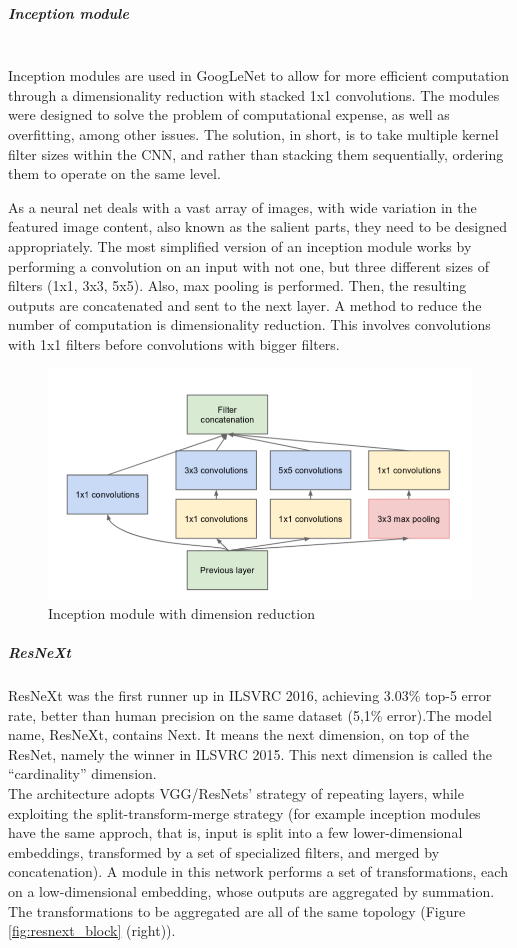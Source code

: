 \documentclass{article}
\begin{document}
\subparagraph{Inception module}\mbox{}\\
Inception modules are used in GoogLeNet to allow for more efficient computation through a dimensionality reduction with stacked 1x1 convolutions. The modules were designed to solve the problem of computational expense, as well as overfitting, among other issues. The solution, in short, is to take multiple kernel filter sizes within the CNN, and rather than stacking them sequentially, ordering them to operate on the same level. 

As a neural net deals with a vast array of images, with wide variation in the featured image content, also known as the salient parts, they need to be designed appropriately. The most simplified version of an inception module works by performing a convolution on an input with not one, but three different sizes of filters (1x1, 3x3, 5x5). Also, max pooling is performed. Then, the resulting outputs are concatenated and sent to the next layer.
A method to reduce the number of computation is dimensionality reduction. This involves convolutions with 1x1 filters before convolutions with bigger filters.
\begin{figure}[h]
	\centering
	\includegraphics[width=0.7\linewidth]{image/inc_module}
	\caption{Inception module with dimension reduction}
	\label{fig:incmodule}
\end{figure}




\subparagraph{ResNeXt}
ResNeXt \cite{resnext} was the first runner up in ILSVRC 2016, achieving 3.03\% top-5 error rate, better than human precision on the same dataset (5,1\% error).The model name, ResNeXt, contains Next. It means the next dimension, on top of the ResNet, namely the winner in ILSVRC 2015. This next dimension is called the “cardinality” dimension.\\
The architecture adopts VGG/ResNets’ strategy of repeating layers, while
exploiting the split-transform-merge strategy (for example inception modules have the same approch, that is, input is split into a few lower-dimensional embeddings, transformed by a set of specialized filters, and merged by concatenation). 
A module in this network performs a set of transformations, each on a low-dimensional embedding, whose outputs are aggregated by summation. The transformations to be aggregated are all of the same topology (Figure \ref{fig:resnext_block} (right)).\\
\end{document}
